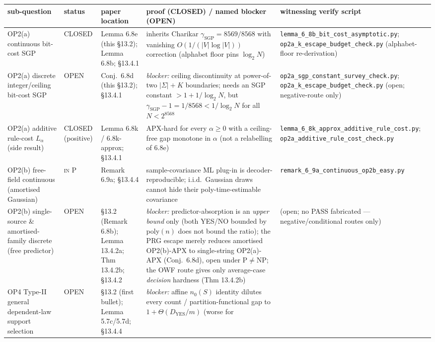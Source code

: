 \documentclass[
]{article}
\begin{document}
\noindent\begin{tabular}{@{}p{2.7cm}p{1.5cm}p{2.6cm}p{3.3cm}p{3.0cm}@{}}
\hline
\textbf{sub-question} & \textbf{status} & \textbf{paper location} &
\textbf{proof (CLOSED) / named blocker (OPEN)} &
\textbf{witnessing verify script}\\
\hline
OP2(a) continuous bit-cost SGP
& CLOSED
& Lemma 6.8e (this §13.2); Lemma 6.8b; §13.4.1
& inherits Charikar $\gamma_{\mathrm{SGP}}=8569/8568$ with vanishing
$O(1/(|V|\log|V|))$ correction (alphabet floor pins $\log_2 N$)
& \texttt{lemma\_6\_8b\_bit\_cost\_asymptotic.py};
\texttt{op2a\_k\_escape\_budget\_check.py} (alphabet-floor re-derivation)\\
OP2(a) discrete integer/ceiling bit-cost SGP
& OPEN
& Conj.\ 6.8d (this §13.2); §13.4.1
& \emph{blocker:} ceiling discontinuity at power-of-two $|\Sigma|+K$
boundaries; needs an SGP constant $>1+1/\log_2 N$, but
$\gamma_{\mathrm{SGP}}-1=1/8568<1/\log_2 N$ for all $N<2^{8568}$
& \texttt{op2a\_sgp\_constant\_survey\_check.py};
\texttt{op2a\_k\_escape\_budget\_check.py} (open; negative-route only)\\
OP2(a) additive rule-cost $L_\alpha$ (side result)
& CLOSED (positive)
& Lemma 6.8k / 6.8k-approx; §13.4.1
& APX-hard for every $\alpha\ge0$ with a ceiling-free gap monotone in
$\alpha$ (not a relabelling of 6.8e)
& \texttt{lemma\_6\_8k\_approx\_additive\_rule\_cost.py};
\texttt{op2a\_additive\_rule\_cost\_check.py}\\
OP2(b) free-field continuous (amortised Gaussian)
& \textsc{in P}
& Remark 6.9a; §13.4.4
& sample-covariance ML plug-in is decoder-reproducible; i.i.d.\ Gaussian
draws cannot hide their poly-time-estimable covariance
& \texttt{remark\_6\_9a\_continuous\_op2b\_easy.py}\\
OP2(b) single-source \& amortised-family discrete (free predictor)
& OPEN
& §13.2 (Remark 6.8b); Lemma 13.4.2a; Thm 13.4.2b; §13.4.2
& \emph{blocker:} predictor-absorption is an \emph{upper bound} only
(both YES/NO bounded by poly$(n)$ does not bound the ratio); the PRG
escape merely reduces amortised OP2(b)-APX to single-string
OP2(a)-APX (Conj.\ 6.8d), open under $\mathrm P\neq\mathrm{NP}$; the
OWF route gives only average-case \emph{decision} hardness (Thm 13.4.2b)
& (open; no PASS fabricated --- negative/conditional routes only)\\
OP4 Type-II general dependent-law support selection
& OPEN
& §13.2 (first bullet); Lemma 5.7c/5.7d; §13.4.4
& \emph{blocker:} affine $n_0(S)$ identity dilutes every count /
partition-functional gap to $1+\Theta(D_{\mathrm{YES}}/m)$ (worse for

\end{tabular}
\end{document}
